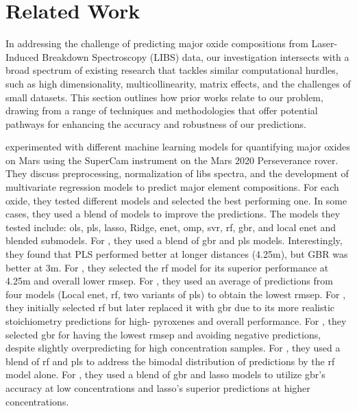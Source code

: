 \section{Related Work}
In addressing the challenge of predicting major oxide compositions from Laser-Induced Breakdown Spectroscopy (LIBS) data, our investigation intersects with a broad spectrum of existing research that tackles similar computational hurdles, such as high dimensionality, multicollinearity, matrix effects, and the challenges of small datasets.
This section outlines how prior works relate to our problem, drawing from a range of techniques and methodologies that offer potential pathways for enhancing the accuracy and robustness of our predictions.

\citet{andersonPostlandingMajorElement2022} experimented with different machine learning models for quantifying major oxides on Mars using the SuperCam instrument on the Mars 2020 Perseverance rover.
They discuss preprocessing, normalization of \gls{libs} spectra, and the development of multivariate regression models to predict major element compositions.
For each oxide, they tested different models and selected the best performing one.
In some cases, they used a blend of models to improve the predictions.
The models they tested include: \gls{ols}, \gls{pls}, \gls{lasso}, Ridge, \gls{enet}, \gls{omp}, \gls{svr}, \gls{rf}, \gls{gbr}, and local \gls{enet} and blended submodels.
For , they used a blend of \gls{gbr} and \gls{pls} models.
Interestingly, they found that PLS performed better at longer distances (4.25m), but GBR was better at 3m.
For , they selected the \gls{rf} model for its superior performance at 4.25m and overall lower \gls{rmsep}.
For , they used an average of predictions from four models (Local \gls{enet}, \gls{rf}, two variants of \gls{pls}) to obtain the lowest \gls{rmsep}.
For , they initially selected \gls{rf} but later replaced it with \gls{gbr} due to its more realistic stoichiometry predictions for high- pyroxenes and overall performance.
For , they selected \gls{gbr} for having the lowest \gls{rmsep} and avoiding negative predictions, despite slightly overpredicting  for high concentration samples.
For , they used a blend of \gls{rf} and \gls{pls} to address the bimodal distribution of  predictions by the \gls{rf} model alone.
For , they used a blend of \gls{gbr} and \gls{lasso} models to utilize \gls{gbr}'s accuracy at low concentrations and \gls{lasso}'s superior predictions at higher concentrations.
